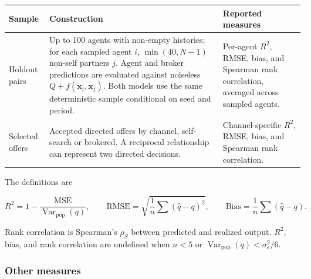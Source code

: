 \documentclass[11pt]{article}
\begin{document}
{
\begin{longtable}[]{@{}
  >{\raggedright\arraybackslash}p{}
  >{\raggedright\arraybackslash}p{}
  >{\raggedright\arraybackslash}p{}@{}}
\toprule\noalign{}
\begin{minipage}[b]{\linewidth}\raggedright
Sample
\end{minipage} & \begin{minipage}[b]{\linewidth}\raggedright
Construction
\end{minipage} & \begin{minipage}[b]{\linewidth}\raggedright
Reported measures
\end{minipage} \\
\midrule\noalign{}
\endhead
\bottomrule\noalign{}
\endlastfoot
Holdout pairs & Up to 100 agents with non-empty histories; for each sampled agent \(i\), \(\min(40,N-1)\) non-self partners \(j\). Agent and broker predictions are evaluated against noiseless \(Q + f(\mathbf{x}_i,\mathbf{x}_j)\). Both models use the same deterministic sample conditional on seed and period. & Per-agent \(R^2\), RMSE, bias, and Spearman rank correlation, averaged across sampled agents. \\
Selected offers & Accepted directed offers by channel, self-search or brokered. A reciprocal relationship can represent two directed decisions. & Channel-specific \(R^2\), RMSE, bias, and Spearman rank correlation. \\
\end{longtable}
}

The definitions are

\[
R^2 = 1 - \frac{\mathrm{MSE}}{\operatorname{Var}_{\mathrm{pop}}(q)}, \qquad
\mathrm{RMSE} = \sqrt{\frac{1}{n}\sum(\hat{q}-q)^2}, \qquad
\mathrm{Bias} = \frac{1}{n}\sum(\hat{q}-q).
\]

Rank correlation is Spearman's \(\rho_S\) between predicted and realized output. \(R^2\), bias, and rank correlation are undefined when \(n < 5\) or \(\operatorname{Var}_{\mathrm{pop}}(q) < \sigma_\varepsilon^2/6\).

\subsubsection{Other measures}\label{other-measures}
\end{document}
